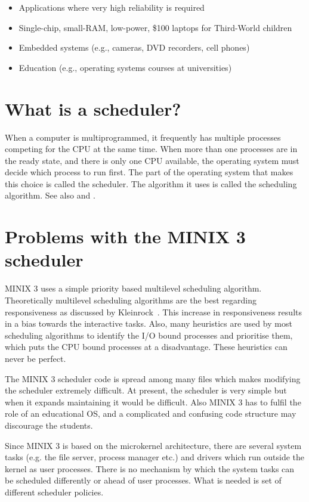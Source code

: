 \begin{itemize}
\item Applications where very high reliability is required
\item Single-chip, small-RAM, low-power, \$100 laptops for Third-World children
\item Embedded systems (e.g., cameras, DVD recorders, cell phones)
\item Education (e.g., operating systems courses at universities)
\end{itemize}

\section{What is a scheduler?}

When a computer is multiprogrammed, it frequently has multiple processes competing for the CPU at the same time.
When more than one processes are in the ready state, and there is only one CPU available, the operating system must
decide which process to run first. The part of the operating system that makes this choice is called the scheduler.
The algorithm it uses is called the scheduling algorithm. See also \cite{ta06} and \cite{ta01}.

\section{Problems with the MINIX 3 scheduler}

MINIX 3 uses a simple priority based multilevel scheduling algorithm. Theoretically multilevel scheduling algorithms are the best regarding responsiveness as discussed by 
Kleinrock~\cite{kl76}. This increase in responsiveness
results in a bias towards the interactive tasks. Also, many heuristics are used by most scheduling algorithms to
identify the I/O bound processes and prioritise them, which puts the CPU bound processes at a disadvantage.
These heuristics can never be perfect.

The MINIX 3 scheduler code is spread among many files which makes modifying the scheduler extremely difficult.
At present, the scheduler is very simple but when it expands maintaining it would be difficult. Also MINIX 3
has to fulfil the role of an educational OS, and a complicated and confusing code structure may discourage the students.

Since MINIX 3 is based on the microkernel architecture, there are several system tasks (e.g. the file server,
process manager etc.) and drivers which run outside the kernel as user processes. There is no mechanism by
which the system tasks can be scheduled differently or ahead of user processes. What is needed is set of different
scheduler policies.

